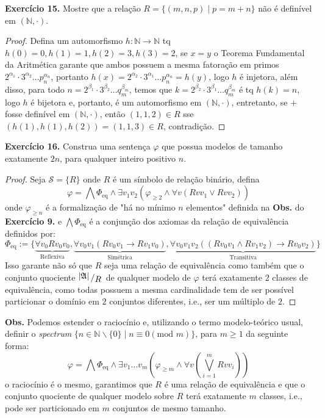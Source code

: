 \documentclass[11pt]{article}
\newcommand{\mc}[1]{\mathcal{#1}}
\newcommand{\mf}[1]{\mathfrak{#1}}
\newcommand{\mbb}[1]{\mathbb{#1}}
\newcommand{\bigslant}[2]{{\raisebox{.2em}{$#1$}\left/\raisebox{-.2em}{$#2$}\right.}}
\begin{document}
\begin{shaded}
\textbf{Exercício 15.} Mostre que a relação $R=\{(m,n,p)\mid p=m+n\}$ não é definível em $(\mbb{N},\cdot)$.
\end{shaded}

\begin{proof}
    Defina um automorfismo $h:\mbb{N}\to\mbb{N}$ tq $h(0)=0,h(1)=1,h(2)=3,h(3)=2$, se $x=y$ o Teorema Fundamental da Aritmética garante que ambos possuem a mesma fatoração em primos $2^{\alpha_1}\cdot3^{\alpha_2}\dots p_n^{\alpha_n}$, portanto $h(x)=2^{\alpha_2}\cdot3^{\alpha_1}\dots p_n^{\alpha_n}=h(y)$, logo $h$ é injetora, além disso, para todo $n=2^{\beta_1}\cdot3^{\beta_2}\dots q_m^{\beta_m}$, temos que $k=2^{\beta_2}\cdot3^{\beta_1}\dots q_m^{\beta_m}$ é tq $h(k)=n$, logo $h$ é bijetora e, portanto, é um automorfismo em $(\mbb{N},\cdot)$, entretanto, se $+$ fosse definível em $(\mbb{N},\cdot)$, então $(1,1,2)\in R$ sse $(h(1),h(1),h(2))=(1,1,3)\in R$, contradição.
\end{proof}

\begin{shaded}
\textbf{Exercício 16.} Construa uma sentença $\varphi$ que possua modelos de tamanho exatamente $2n$, para qualquer inteiro positivo $n$.
\end{shaded}

\begin{proof}
    Seja $\mc{S}=\{R\}$ onde $R$ é um símbolo de relação binário, defina
    $$\varphi=\bigwedge\Phi_\text{eq}\wedge\exists v_1v_2\left(\varphi_{\geq 2}\wedge\forall v\left(Rvv_1\vee Rvv_2\right)\right)$$
    onde $\varphi_{\geq n}$ é a formalização de "há no mínimo $n$ elementos" definida na \textbf{Obs.} do \textbf{Exercício 9.} e $\bigwedge\Phi_\text{eq}$ é a conjunção dos axiomas da relação de equivalência definidos por:
    $$\Phi_\text{eq}:=\{\underbrace{\forall v_0Rv_0v_0}_\text{Reflexiva}, \underbrace{\forall v_0v_1(Rv_0v_1\to Rv_1v_0)}_\text{Simétrica}, \underbrace{\forall v_0v_1v_2((Rv_0v_1\wedge Rv_1v_2)\to Rv_0v_2)}_\text{Transitiva}\}$$
    Isso garante não só que $R$ seja uma relação de equivalência como também que o conjunto quociente $\bigslant{|\mf{A}|}{R}$ de qualquer modelo de $\varphi$ terá exatamente $2$ classes de equivalência, como todas possuem a mesma cardinalidade tem de ser possível particionar o domínio em $2$ conjuntos diferentes, i.e., ser um múltiplo de $2$.
\end{proof}

\begin{shaded}
\textbf{Obs.} Podemos estender o raciocínio e, utilizando o termo modelo-teórico usual, definir o \textit{spectrum} $\{n\in\mbb{N}\backslash\{0\}\mid n\equiv 0(\text{mod }m)\}$, para $m\geq 1$ da seguinte forma:
$$\varphi=\bigwedge\Phi_\text{eq}\wedge\exists v_1\dots v_m\left(\varphi_{\geq m}\wedge\forall v\left(\bigvee_{i=1}^mRvv_i\right)\right)$$
o raciocínio é o mesmo, garantimos que $R$ é uma relação de equivalência e que o conjunto quociente de qualquer modelo sobre $R$ terá exatamente $m$ classes, i.e., pode ser particionado em $m$ conjuntos de mesmo tamanho.
\end{shaded}
\end{document}
